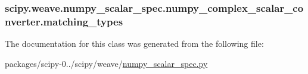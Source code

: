 \subsubsection[{matching\+\_\+types}]{\setlength{\rightskip}{0pt plus 5cm}scipy.\+weave.\+numpy\+\_\+scalar\+\_\+spec.\+numpy\+\_\+complex\+\_\+scalar\+\_\+converter.\+matching\+\_\+types}\label{classscipy_1_1weave_1_1numpy__scalar__spec_1_1numpy__complex__scalar__converter_a598c1277b0398207e19a68792f171efc}


The documentation for this class was generated from the following file\+:\begin{DoxyCompactItemize}
\item 
packages/scipy-\/0../scipy/weave/\hyperlink{numpy__scalar__spec_8py}{numpy\+\_\+scalar\+\_\+spec.\+py}\end{DoxyCompactItemize}
